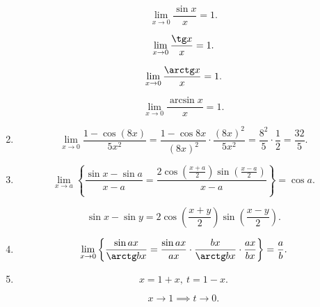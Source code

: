 \begin{enumerate}
    \begin{equation*}
        \lim_{x \to 0} \frac{\sin x}{x} = 1
    .\end{equation*}

    \begin{equation*}
        \lim_{x \to 0} \frac{\tg x}{x} = 1
    .\end{equation*}

    \begin{equation*}
        \lim_{x \to 0} \frac{\arctg x}{x} = 1
    .\end{equation*}

    \begin{equation*}
        \lim_{x \to 0} \frac{\arcsin x}{x} = 1
    .\end{equation*}

\item
    \begin{equation*}
        \lim_{x \to 0} \frac{1 - \cos(8x)}{5x^2} 
        = \frac{1 - \cos 8x}{(8x)^2} \cdot \frac{(8x)^2}{5x^2} 
        = \frac{8^2}{5} \cdot \frac{1}{2} 
        = \frac{32}{5}
    .\end{equation*}

\item
    \begin{equation*}
        \lim_{x \to a} \left\{ \frac{\sin x - \sin a}{x - a} 
        = \frac{2 \cos\left(\frac{x + a}{2}\right) \sin \left(\frac{x - a}{2}\right)}{x - a}
        \right\} = \cos a
    .\end{equation*}

    \begin{equation*}
        \sin x - \sin y = 2 \cos\left(\frac{x + y}{2}\right) \sin\left(\frac{x - y}{2}\right)
    .\end{equation*}

\item
    \begin{equation*}
        \lim_{x \to 0} \left\{ \frac{\sin ax}{\arctg bx} 
        = \frac{\sin ax}{ax} \cdot \frac{bx}{\arctg bx} \cdot \frac{ax}{bx} \right\}
        = \frac{a}{b}
    .\end{equation*}

\item
    \begin{equation*}
        x = 1 + x, \ t = 1 - x
    .\end{equation*}

    \begin{equation*}
        x \to 1 \implies t \to 0
    .\end{equation*}


\end{enumerate}
